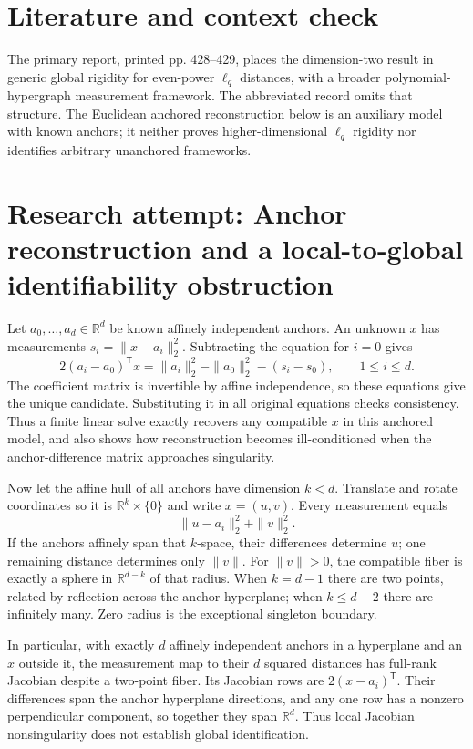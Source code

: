 \documentclass[11pt]{article}
\begin{document}
\section{Literature and context check}
The primary report, printed pp. 428--429, places the dimension-two result in generic global rigidity for even-power $\ell_q$ distances, with a broader polynomial-hypergraph measurement framework. The abbreviated record omits that structure. The Euclidean anchored reconstruction below is an auxiliary model with known anchors; it neither proves higher-dimensional $\ell_q$ rigidity nor identifies arbitrary unanchored frameworks.
\section{Research attempt: Anchor reconstruction and a local-to-global identifiability obstruction}

Let $a_0,\ldots,a_d\in\mathbb R^d$ be known affinely independent anchors. An unknown $x$ has measurements $s_i=\|x-a_i\|_2^2$. Subtracting the equation for $i=0$ gives
\[
2(a_i-a_0)^{\mathsf T}x=\|a_i\|_2^2-\|a_0\|_2^2-(s_i-s_0),\qquad 1\leq i\leq d.
\]
The coefficient matrix is invertible by affine independence, so these equations give the unique candidate. Substituting it in all original equations checks consistency. Thus a finite linear solve exactly recovers any compatible $x$ in this anchored model, and also shows how reconstruction becomes ill-conditioned when the anchor-difference matrix approaches singularity.

Now let the affine hull of all anchors have dimension $k<d$. Translate and rotate coordinates so it is $\mathbb R^k\times\{0\}$ and write $x=(u,v)$. Every measurement equals
\[
\|u-a_i\|_2^2+\|v\|_2^2.
\]
If the anchors affinely span that $k$-space, their differences determine $u$; one remaining distance determines only $\|v\|$. For $\|v\|>0$, the compatible fiber is exactly a sphere in $\mathbb R^{d-k}$ of that radius. When $k=d-1$ there are two points, related by reflection across the anchor hyperplane; when $k\leq d-2$ there are infinitely many. Zero radius is the exceptional singleton boundary.

In particular, with exactly $d$ affinely independent anchors in a hyperplane and an $x$ outside it, the measurement map to their $d$ squared distances has full-rank Jacobian despite a two-point fiber. Its Jacobian rows are $2(x-a_i)^{\mathsf T}$. Their differences span the anchor hyperplane directions, and any one row has a nonzero perpendicular component, so together they span $\mathbb R^d$. Thus local Jacobian nonsingularity does not establish global identification.
\end{document}
